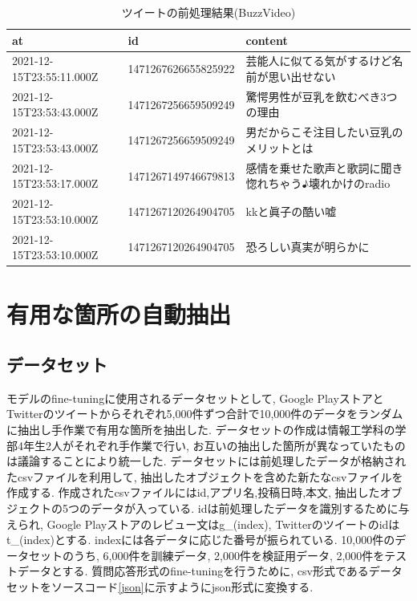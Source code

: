 \begin{table}[htbp]
  \caption{ツイートの前処理結果(BuzzVideo)}
  \label{tb:twittercsv}
  \begin{center}
  \begin{tabularx}{\linewidth}{|l|l|X|}
    \hline
    at&id&content\\\hline\hline
    2021-12-15T23:55:11.000Z&1471267626655825922&芸能人に似てる気がするけど名前が思い出せない\\\hline
    2021-12-15T23:53:43.000Z&1471267256659509249&驚愕男性が豆乳を飲むべき3つの理由\\\hline
    2021-12-15T23:53:43.000Z&1471267256659509249&男だからこそ注目したい豆乳のメリットとは\\\hline
    2021-12-15T23:53:17.000Z&1471267149746679813&感情を乗せた歌声と歌詞に聞き惚れちゃう♪壊れかけのradio\\\hline
    2021-12-15T23:53:10.000Z&1471267120264904705&kkと眞子の酷い嘘\\\hline
    2021-12-15T23:53:10.000Z&1471267120264904705&恐ろしい真実が明らかに\\\hline
  \end{tabularx}\end{center}
\end{table}


\section{有用な箇所の自動抽出}
\subsection{データセット}
モデルのfine-tuningに使用されるデータセットとして, Google PlayストアとTwitterのツイートからそれぞれ5,000件ずつ合計で10,000件のデータをランダムに抽出し手作業で有用な箇所を抽出した. データセットの作成は情報工学科の学部4年生2人がそれぞれ手作業で行い, お互いの抽出した箇所が異なっていたものは議論することにより統一した. 
データセットには前処理したデータが格納されたcsvファイルを利用して, 抽出したオブジェクトを含めた新たなcsvファイルを作成する. 作成されたcsvファイルにはid,アプリ名,投稿日時,本文, 抽出したオブジェクトの5つのデータが入っている. idは前処理したデータを識別するために与えられ, Google Playストアのレビュー文はg\_(index), Twitterのツイートのidはt\_(index)とする.  indexには各データに応じた番号が振られている. 
10,000件のデータセットのうち, 6,000件を訓練データ, 2,000件を検証用データ, 2,000件をテストデータとする. 質問応答形式のfine-tuningを行うために, csv形式であるデータセットをソースコード\ref{json}に示すようにjson形式に変換する. 

